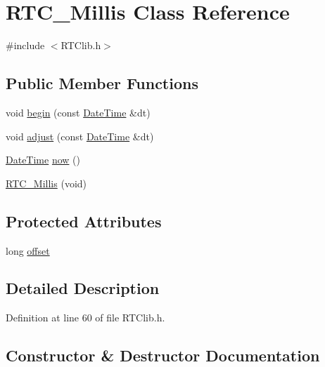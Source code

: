 \hypertarget{class_r_t_c___millis}{}\section{R\+T\+C\+\_\+\+Millis Class Reference}
\label{class_r_t_c___millis}


{\ttfamily \#include $<$R\+T\+Clib.\+h$>$}

\subsection*{Public Member Functions}
\begin{DoxyCompactItemize}
\item 
void \hyperlink{class_r_t_c___millis_a17670c5fcf820867a8018aa2083c62cd}{begin} (const \hyperlink{class_date_time}{Date\+Time} \&dt)
\item 
void \hyperlink{class_r_t_c___millis_adcf4a13317d9b785ae79613b3429a46a}{adjust} (const \hyperlink{class_date_time}{Date\+Time} \&dt)
\item 
\hyperlink{class_date_time}{Date\+Time} \hyperlink{class_r_t_c___millis_aac263a7087f8603199eb45cdc7c3c146}{now} ()
\item 
\hyperlink{class_r_t_c___millis_a2bf3cc48adda7c115553a499a46b3506}{R\+T\+C\+\_\+\+Millis} (void)
\end{DoxyCompactItemize}
\subsection*{Protected Attributes}
\begin{DoxyCompactItemize}
\item 
long \hyperlink{class_r_t_c___millis_a9e3029d6552e87d7c68a5bd6aa3e6b92}{offset}
\end{DoxyCompactItemize}


\subsection{Detailed Description}


Definition at line 60 of file R\+T\+Clib.\+h.



\subsection{Constructor \& Destructor Documentation}
